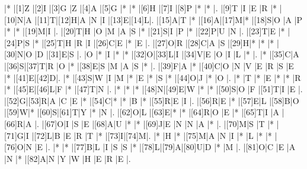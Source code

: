 \begin{Puzzle}{14}{20}
|*    |[1]Z |[2]I |[3]G |Z    |[4]A |[5]G |*    |*    |[6]H |[7]I |[8]P |*    |*    |.
|[9]T |I    |E    |R    |*    |[10]N|A    |[11]T|[12]H|A    |N    |I    |[13]E|[14]L|.
|[15]A|T    |*    |[16]A|[17]M|*    |[18]S|O    |A    |P    |*    |*    |[19]M|I    |.
|[20]T|H    |O    |M    |A    |S    |*    |[21]S|I    |P    |*    |[22]P|U    |N    |.
|[23]T|E    |*    |[24]P|S    |*    |[25]T|H    |R    |I    |[26]C|E    |*    |E    |.
|[27]O|R    |[28]C|A    |S    |[29]H|*    |*    |*    |[30]N|O    |D    |[31]E|S    |.
|O    |*    |I    |*    |*    |[32]O|[33]L|I    |[34]V|E    |O    |I    |L    |*    |.
|*    |[35]C|A    |[36]S|[37]T|R    |O    |*    |[38]E|S    |M    |A    |S    |*    |.
|[39]F|A    |*    |[40]C|O    |N    |V    |E    |R    |S    |E    |*    |[41]E|[42]D|.
|*    |[43]S|W    |I    |M    |*    |E    |*    |S    |*    |[44]O|J    |*    |O    |.
|*    |T    |*    |E    |*    |*    |R    |*    |[45]E|[46]L|F    |*    |[47]T|N    |.
|*    |*    |*    |[48]N|[49]E|W    |*    |*    |[50]S|O    |F    |[51]T|I    |E    |.
|[52]G|[53]R|A    |C    |E    |*    |[54]C|*    |*    |B    |*    |[55]R|E    |I    |.
|[56]R|E    |*    |[57]E|L    |[58]B|O    |[59]W|*    |[60]S|[61]T|Y    |*    |N    |.
|[62]O|L    |[63]E|*    |*    |[64]R|O    |E    |*    |[65]T|I    |A    |[66]R|A    |.
|[67]O|I    |S    |E    |[68]A|U    |*    |*    |[69]J|E    |N    |N    |A    |*    |.
|[70]M|S    |T    |*    |[71]G|I    |[72]L|B    |E    |R    |T    |*    |[73]I|[74]M|.
|*    |H    |*    |[75]M|A    |N    |I    |*    |L    |*    |*    |[76]O|N    |E    |.
|*    |*    |[77]B|L    |I    |S    |S    |*    |[78]L|[79]A|[80]U|D    |*    |M    |.
|[81]O|C    |E    |A    |N    |*    |[82]A|N    |Y    |W    |H    |E    |R    |E    |.
\end{Puzzle}
